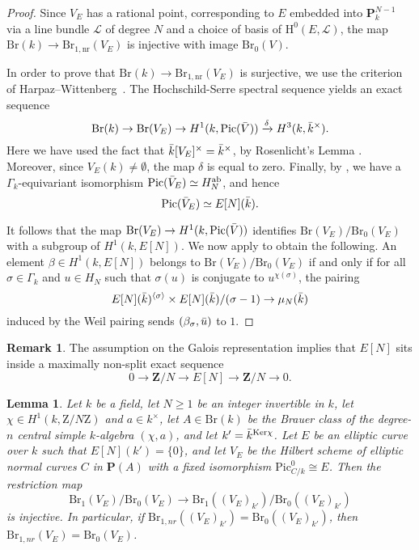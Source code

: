 \documentclass[10pt,letterpaper,twoside]{article}
\newcommand{\Lscr}{\mathcal{L}}
\renewcommand{\H}{\mathrm{H}}
\newcommand{\Z}{\mathrm{Z}}
\renewcommand{\1}{\mathbf{1}}
\newcommand{\bP}{\mathbf{P}}
\newcommand{\bZ}{\mathbf{Z}}
\newcommand{\nr}{\mathrm{nr}}
\renewcommand{\geq}{\geqslant}
\newcommand{\Pic}{\mathrm{Pic}}
\newcommand{\Br}{\mathrm{Br}}
\newcommand{\iso}{\cong}
\theoremstyle{plain}
\newtheorem{lemma}[theorem]{Lemma}
\theoremstyle{plain}
\theoremstyle{definition}
\theoremstyle{named}
\theoremstyle{definition}
\newtheorem{remark}[theorem]{Remark}
\begin{document}
	\begin{proof}
		Since $V_E$ has a rational point, corresponding to $E$ embedded into $\bP^{N-1}_k$
		via a line bundle $\Lscr$ of degree $N$ and a choice of basis of $\H^0(E,\Lscr)$, the map
		$\Br(k)\rightarrow\Br_{1,\nr}(V_E)$ is injective with image $\Br_0(V)$. 
		
		In order to prove that $\Br(k)\rightarrow\Br_{1,\nr}(V_E)$ is surjective, we use the criterion of
		Harpaz--Wittenberg~\cite{harpaz-wittenberg-massey}. The Hochschild-Serre spectral sequence yields an exact sequence
		\[\Br(k)\to \Br(V_E)\to H^1(k,\Pic(\Bar{V}))\xrightarrow{\delta}H^3(k,\Bar{k}^\times).\]
		Here we have used the fact that $\Bar{k}[V_E]^\times=\Bar{k}^\times$, by Rosenlicht's Lemma \cite{}. Moreover, since $V_E(k)\neq \emptyset$, the map $\delta$ is equal to zero. Finally, by \cite{}, we have a $\Gamma_k$-equivariant isomorphism $\Pic(\Bar{V}_E)\simeq H^{\mathrm{ab}}_N$, and hence
		\[\Pic(\Bar{V}_E)\simeq E[N](\Bar{k}).\]
		
		It follows that the map $\Br(V_E)\to H^1(k,\Pic(\Bar{V}))$ identifies $\Br(V_E)/\Br_0(V_E)$ with a subgroup of $H^1(k,E[N])$. We now apply \cite[Proposition 3.3]{harpaz-wittenberg-massey} to obtain the following. An element $\beta\in H^1(k,E[N])$ belongs to $\Br(V_E)/\Br_0(V_E)$ if and only if for all $\sigma\in \Gamma_k$ and $u\in H_N$ such that $\sigma(u)$ is conjugate to $u^{\chi(\sigma)}$, the pairing
		\[E[N](\Bar{k})^{\langle\sigma\rangle}\times E[N](\Bar{k})/(\sigma-1)\to \mu_N(\Bar{k})\]
		induced by the Weil pairing sends $(\beta_{\sigma},\Bar{u})$ to $1$. 
	\end{proof}
	
	\begin{remark}
		The assumption on the Galois representation implies that $E[N]$ sits inside a maximally non-split exact sequence
		$$0\rightarrow\bZ/N\rightarrow E[N]\rightarrow\bZ/N\rightarrow 0.$$
	\end{remark}
	
	
	
	\begin{lemma}
		Let $k$ be a field, let $N\geq 1$ be an integer invertible in $k$, let $\chi\in H^1(k,\Z/N\Z)$ and $a\in k^\times$, let $A\in \Br(k)$ be the Brauer class of the degree-$n$ central simple $k$-algebra $(\chi,a)$, and let $k'=\Bar{k}^{\mathrm{Ker}\chi}$. Let $E$ be an elliptic curve over $k$ such that $E[N](k')=\{0\}$, and let $V_E$ be the Hilbert scheme of elliptic normal curves $C$ in $\bP(A)$
		with a fixed isomorphism $\Pic_{C/k}^0\iso E$. Then the restriction map
		\[\Br_1(V_E)/\Br_0(V_E)\to \Br_1((V_E)_{k'})/\Br_0((V_E)_{k'})\]
		is injective. In particular, if $\Br_{1,nr}((V_E)_{k'})=\Br_0((V_E)_{k'})$, then $\Br_{1,nr}(V_E)=\Br_0(V_E)$.
	\end{lemma}
	
\end{document}
